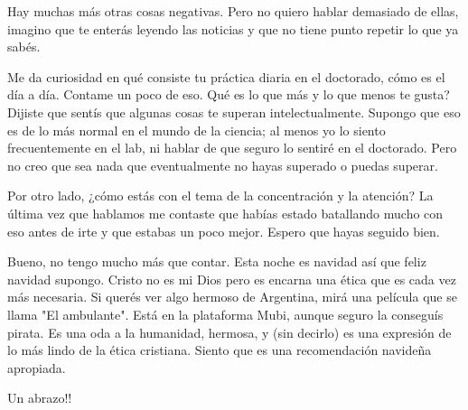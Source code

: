 \documentclass[a4paper]{article}
\begin{document}
Hay muchas más otras cosas negativas. Pero no quiero hablar demasiado de
ellas, imagino que te enterás leyendo las noticias y que no tiene punto
repetir lo que ya sabés. 

Me da curiosidad en qué consiste tu práctica diaria en el doctorado, cómo es el
día a día. Contame un poco de eso. Qué es lo que más y lo que menos te gusta?
Dijiste que sentís que algunas cosas te superan intelectualmente. Supongo que
eso es de lo más normal en el mundo de la ciencia; al menos yo lo siento
frecuentemente en el lab, ni hablar de que seguro lo sentiré en el doctorado.
Pero no creo que sea nada que eventualmente no hayas superado o puedas superar.

Por otro lado, ¿cómo estás con el tema de la concentración y la atención? La
última vez que hablamos me contaste que habías estado batallando mucho con eso
antes de irte y que estabas un poco mejor. Espero que hayas seguido bien. 

Bueno, no tengo mucho más que contar. Esta noche es navidad así que feliz
navidad supongo. Cristo no es mi Dios pero es encarna una ética que es cada vez
más necesaria. Si querés ver algo hermoso de Argentina, mirá una película que se
llama "El ambulante". Está en la plataforma Mubi, aunque seguro la conseguís
pirata. Es una oda a la humanidad, hermosa, y (sin decirlo) es una expresión de
lo más lindo de la ética cristiana. Siento que es una recomendación navideña
apropiada. 

Un abrazo!!
\end{document}
